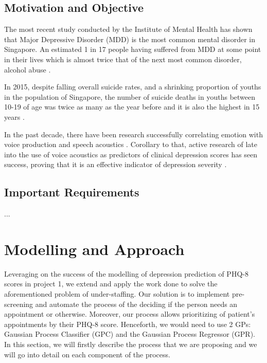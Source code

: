 \documentclass{article}
\begin{document}
	\subsection{Motivation and Objective}
	The most recent study conducted by the Institute of Mental Health has shown that Major Depressive Disorder (MDD) is the most common mental disorder in Singapore. An estimated 1 in 17 people having suffered from MDD at some point in their lives which is almost twice that of the next most common disorder, alcohol abuse \cite{annacadmedsg}.

	In 2015, despite falling overall suicide rates, and a shrinking proportion of youths in the population of Singapore, the number of suicide deaths in youths between 10-19 of age was twice as many as the year before and it is also the highest in 15 years \cite{samaritansofsingapore2016}.
	
	In the past decade, there have been research successfully correlating emotion with voice production and speech acoustics \cite{uwa2001}. 
	Corollary to that, active research of late into the use of voice acoustics as predictors of clinical depression scores has seen success, proving that it is an effective indicator of depression severity \cite{jov2016}.\\
	
	\subsection{Important Requirements}
	...
	
	\section{Modelling and Approach}
	Leveraging on the success of the modelling of depression prediction of PHQ-8 scores in project 1, we extend and apply the work done to solve the aforementioned problem of under-staffing. 
	Our solution is to implement pre-screening and automate the process of the deciding if the person needs an appointment or otherwise. 
	Moreover, our process allows prioritizing of patient's appointments by their PHQ-8 score. 
	Henceforth, we would need to use 2 GPs: Gaussian Process Classifier (GPC) and the Gaussian Process Regressor (GPR). 
	In this section, we will firstly describe the process that we are proposing and we will go into detail on each component of the process.
\end{document}
